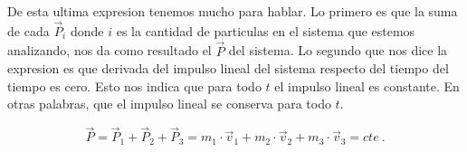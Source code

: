 \documentclass[../Main.tex]{subfiles}
\begin{document}
\begin{minipage}[t]{0.6\textwidth}
De esta ultima expresion tenemos mucho para hablar. Lo primero es que la suma
de cada $\vec{P} _i$ donde $i$ es la cantidad de particulas en el sistema que
estemos analizando, nos da como resultado el $\vec{P}$ del sistema. Lo segundo
que nos dice la expresion es que derivada del impulso lineal del sistema
respecto del tiempo del tiempo es cero. Esto nos indica que para todo $t$ el 
impulso lineal es constante. En otras palabras, que el impulso lineal se
conserva para todo $t$.

\begin{equation}
    \vec{P} = \vec{P} _1 + \vec{P} _2 + \vec{P} _3 = m_1 \cdot \vec{v} _1 + m_2 \cdot \vec{v} _2 + m_3 \cdot \vec{v} _3 = cte \ .
    \label{eq:sistP}
\end{equation}

\end{minipage}
\newpage
\begin{minipage}[t]{0.3\textwidth}
\end{minipage}
\hfill
\end{document}

